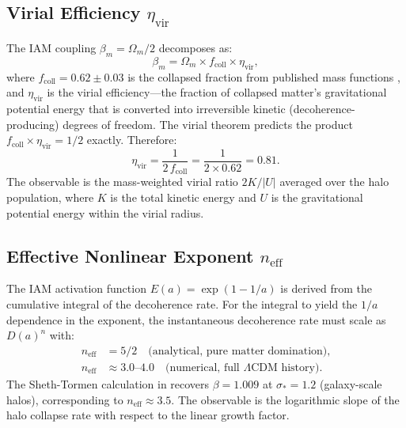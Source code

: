 \documentclass[12pt,a4paper]{article}
\begin{document}
\subsection{Virial Efficiency $\eta_{\mathrm{vir}}$}
\label{sec:pred_eta}

The IAM coupling $\beta_m = \Omega_m/2$ decomposes as:
\begin{equation}
  \beta_m = \Omega_m \times f_{\mathrm{coll}} \times \eta_{\mathrm{vir}},
  \label{eq:decompose}
\end{equation}
where $f_{\mathrm{coll}} = 0.62 \pm 0.03$ is the collapsed fraction from
published mass functions \citep{Tinker2008}, and $\eta_{\mathrm{vir}}$
is the virial efficiency---the fraction of collapsed matter's gravitational
potential energy that is converted into irreversible kinetic
(decoherence-producing) degrees of freedom. The virial theorem predicts
the product $f_{\mathrm{coll}} \times \eta_{\mathrm{vir}} = 1/2$ exactly.
Therefore:
\begin{equation}
  \eta_{\mathrm{vir}} = \frac{1}{2\,f_{\mathrm{coll}}}
    = \frac{1}{2 \times 0.62} = 0.81.
  \label{eq:eta_pred}
\end{equation}
The observable is the mass-weighted virial ratio $2K/|U|$ averaged over
the halo population, where $K$ is the total kinetic energy and $U$ is
the gravitational potential energy within the virial radius.

\subsection{Effective Nonlinear Exponent $n_{\mathrm{eff}}$}
\label{sec:pred_neff}

The IAM activation function $E(a) = \exp(1 - 1/a)$ is derived from the
cumulative integral of the decoherence rate. For the integral to yield
the $1/a$ dependence in the exponent, the instantaneous decoherence rate
must scale as $D(a)^n$ with:
\begin{align}
  n_{\mathrm{eff}} &= 5/2 \quad\text{(analytical, pure matter domination),}
  \label{eq:neff_analytic}\\
  n_{\mathrm{eff}} &\approx 3.0\text{--}4.0 \quad
    \text{(numerical, full $\Lambda$CDM history).}
  \label{eq:neff_numeric}
\end{align}
The Sheth-Tormen calculation in \citet{Mahaffey2026a} recovers
$\beta = 1.009$ at $\sigma_* = 1.2$ (galaxy-scale halos), corresponding
to $n_{\mathrm{eff}} \approx 3.5$. The observable is the logarithmic
slope of the halo collapse rate with respect to the linear growth factor.
\end{document}
